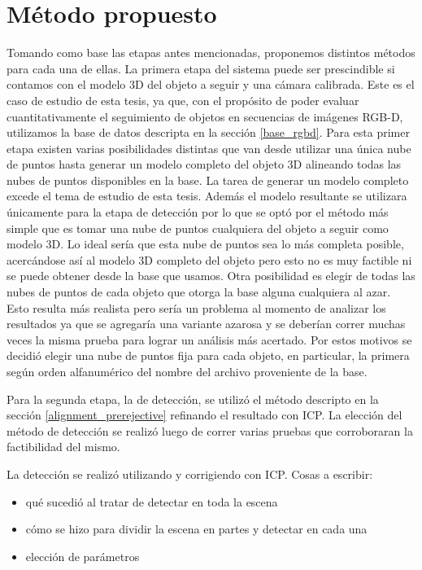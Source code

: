 \section{Método propuesto}
Tomando como base las etapas antes mencionadas, proponemos distintos métodos para cada una de ellas. La primera etapa del sistema puede ser prescindible si contamos con el modelo 3D del objeto a seguir y una cámara calibrada. Este es el caso de estudio de esta tesis, ya que, con el propósito de poder evaluar cuantitativamente el seguimiento de objetos en secuencias de imágenes RGB-D, utilizamos la base de datos descripta en la sección \ref{base_rgbd}.
Para esta primer etapa existen varias posibilidades distintas que van desde utilizar una única nube de puntos hasta generar un modelo completo del objeto 3D alineando todas las nubes de puntos disponibles en la base. La tarea de generar un modelo completo excede el tema de estudio de esta tesis. Además el modelo resultante se utilizara únicamente para la etapa de detección por lo que se optó por el método más simple que es tomar una nube de puntos cualquiera del objeto a seguir como modelo 3D. Lo ideal sería que esta nube de puntos sea lo más completa posible, acercándose así al modelo 3D completo del objeto pero esto no es muy factible ni se puede obtener desde la base que usamos. Otra posibilidad es elegir de todas las nubes de puntos de cada objeto que otorga la base alguna cualquiera al azar. Esto resulta más realista pero sería un problema al momento de analizar los resultados ya que se agregaría una variante azarosa y se deberían correr muchas veces la misma prueba para lograr un análisis más acertado. Por estos motivos se decidió elegir una nube de puntos fija para cada objeto, en particular, la primera según orden alfanumérico del nombre del archivo proveniente de la base.

Para la segunda etapa, la de detección, se utilizó el método descripto en la sección \ref{alignment_prerejective} refinando el resultado con ICP. La elección del método de detección se realizó luego de correr varias pruebas que corroboraran la factibilidad del mismo.




La detección se realizó utilizando \cite{6630856} y corrigiendo con ICP.
Cosas a escribir:
\begin{itemize}
	\item qué sucedió al tratar de detectar en toda la escena
	\item cómo se hizo para dividir la escena en partes y detectar en cada una
	\item elección de parámetros
\end{itemize}


